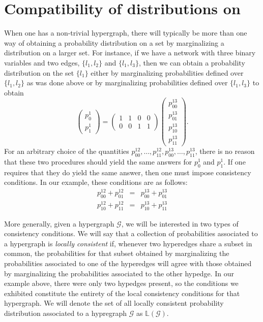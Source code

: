 \section{Compatibility of distributions on \gnpm{}}\label{sec:compatibilityofgpms}
When one has a non-trivial hypergraph, there will typically be more
than one way of obtaining a probability distribution on a set by
marginalizing a distribution on a larger set.  For instance, if we have
a network with three binary variables and two edges, $\{l_1,l_2\}$ and
$\{l_1,l_3\}$, then we can obtain a probability distribution on the
set $\{l_1\}$ either by marginalizing probabilities defined over
$\{l_1,l_2\}$ as was done above or by marginalizing probabilities
defined over $\{l_1,l_3\}$ to obtain
\begin{equation}
 \begin{pmatrix}
  p^{1}_{0}\\
  p^{1}_{1}
 \end{pmatrix} =
 \begin{pmatrix}
  1 & 1 & 0 & 0\\
  0 & 0 & 1 & 1
 \end{pmatrix}
 \begin{pmatrix}
  p^{13}_{00}\\
  p^{13}_{01}\\
  p^{13}_{10}\\
  p^{13}_{11}
 \end{pmatrix}.
\end{equation}
For an arbitrary choice of the quantities $p^{12}_{00}, \ldots,
p^{12}_{11}, p^{13}_{00}, \ldots, p^{13}_{11}$, there is no reason
that these two procedures should yield the same answers for $p^1_0$
and $p^1_1$.  If one requires that they do yield the same answer, then
one must impose consistency conditions.   In our example, these
conditions are as follows:
\begin{eqnarray}
 p^{12}_{00} + p^{12}_{01} &=&
  p^{13}_{00} + p^{13}_{01}\\
 p^{12}_{10} + p^{12}_{11} &=&
  p^{13}_{10} + p^{13}_{11}
\end{eqnarray}

More generally, given a hypergraph $\mathcal{G}$, we will be
interested in two types of consistency conditions.  We will say that a
collection of probabilities associated to a hypergraph is
\emph{locally consistent} if, whenever two hyperedges share a subset in
common, the probabilities for that subset obtained by marginalizing
the probabilities associated to one of the hyperedges will agree with
those obtained by marginalizing the probabilities associated to the
other hypedge.  In our example above, there were only two hypedges
present, so the conditions we exhibited constitute the entirety of the
local consistency conditions for that hypergraph.  We will denote the
set of all locally consistent probability distribution associated to a
hypregraph $\mathcal{G}$ as $\mathbb{L}(\mathcal{G})$.


